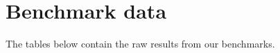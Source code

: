 \chapter{Benchmark data}
\label{chap:benchdata}
The tables below contain the raw results from our benchmarks.



